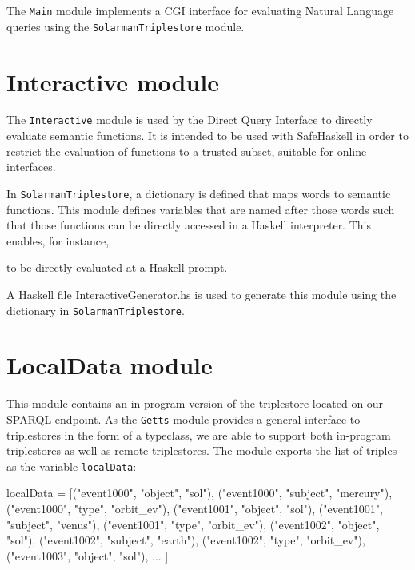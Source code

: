 \documentclass[../main.tex]{subfiles}
\begin{document}
The \texttt{Main} module implements a CGI interface for evaluating Natural Language queries using the \texttt{SolarmanTriplestore} module.

\section{Interactive module}

The \texttt{Interactive} module is used by the Direct Query Interface to directly evaluate semantic functions.  It is intended to be used with SafeHaskell
in order to restrict the evaluation of functions to a trusted subset, suitable for online interfaces.

In \texttt{SolarmanTriplestore}, a dictionary is defined that maps words to semantic functions.  This module defines variables that are named
after those words such that those functions can be directly accessed in a Haskell interpreter.  This enables, for instance,


to be directly evaluated at a Haskell prompt.

A Haskell file InteractiveGenerator.hs is used to generate this module using the dictionary in \texttt{SolarmanTriplestore}.

\section{LocalData module}

This module contains an in-program version of the triplestore located on our SPARQL endpoint.  As the \texttt{Getts} module provides
a general interface to triplestores in the form of a typeclass, we are able to support both in-program triplestores as well as remote triplestores.
The module exports the list of triples as the variable \texttt{localData}:

\begin{code}
	localData = [("event1000", "object", "sol"),
	("event1000", "subject", "mercury"),
	("event1000", "type", "orbit_ev"),
	("event1001", "object", "sol"),
	("event1001", "subject", "venus"),
	("event1001", "type", "orbit_ev"),
	("event1002", "object", "sol"),
	("event1002", "subject", "earth"),
	("event1002", "type", "orbit_ev"),
	("event1003", "object", "sol"),
	... ]
\end{code}
\end{document}
